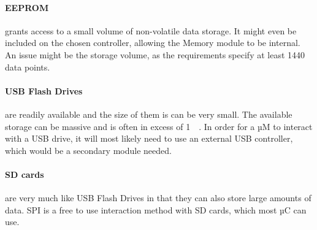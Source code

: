 \paragraph{EEPROM} grants access to a small volume of non-volatile data storage.
It might even be included on the chosen controller, allowing the Memory module to be internal.
An issue might be the storage volume, as the requirements specify at least \num{1440} data points.

\paragraph{USB Flash Drives} are readily available and the size of them is can be very small.
The available storage can be massive and is often in excess of \SI{1}{\giga\byte}. In order for a µM to interact with a USB drive, it will most likely need to use an external USB controller, which would be a secondary module needed.

\paragraph{SD cards} are very much like USB Flash Drives in that they can also store large amounts of data. SPI is a free to use interaction method with SD cards, which most µC can use.

\FloatBarrier
